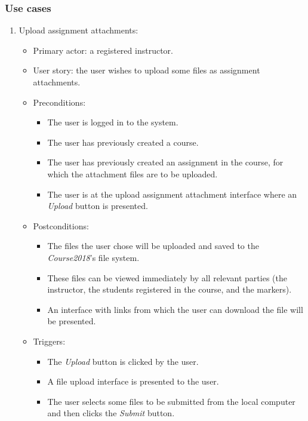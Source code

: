 \subsubsection{Use cases}
\begin{enumerate}

\item Upload assignment attachments:
\begin{itemize}
    \item Primary actor: a registered instructor.
    \item User story: the user wishes to upload some files as assignment
        attachments.
    \item Preconditions:
        \begin{itemize}
            \item The user is logged in to the system.
            \item The user has previously created a course.
            \item The user has previously created an assignment in the course,
                for which the attachment files are to be uploaded.
            \item The user is at the upload assignment attachment interface
                where an \emph{Upload} button is presented.
        \end{itemize}
    \item Postconditions:
        \begin{itemize}
            \item The files the user chose will be uploaded and saved to the
                \emph{Course2018}'s file system.
            \item These files can be viewed immediately by all relevant parties
                (the instructor, the students registered in the course,
                and the markers).
            \item An interface with links from which the user can
                download the file will be presented.
        \end{itemize}
    \item Triggers:
        \begin{itemize}
            \item The \emph{Upload} button is clicked by the user.
            \item A file upload interface is presented to the user.
            \item The user selects some files to be submitted from the
                local computer and then clicks the \emph{Submit} button.

\end{itemize}
\end{itemize}
\end{enumerate}
